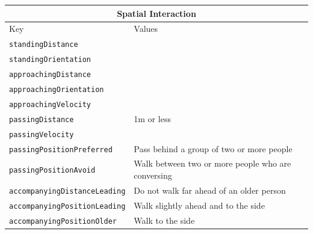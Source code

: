\documentclass{CSSRforAfrica}
\begin{document}
\begin{table}[H]
\begin{center}
\begin{tabular}{|l l|}
\hline \hline
\multicolumn{2}{|c|}{{\small \bf Spatial Interaction}} \\
\hline \hline
 {\small Key  }                                         &  {\small Values }      \\
\hline
{\footnotesize \verb+standingDistance+} 	           & {\footnotesize \verb++ } \vspace{-1mm}\\
{\footnotesize \verb+standingOrientation+} 	           & {\footnotesize \verb++} \vspace{-1mm}\\
{\footnotesize \verb+approachingDistance+} 	   & {\footnotesize \verb++} \vspace{-1mm}\\
{\footnotesize \verb+approachingOrientation+} 	   & {\footnotesize \verb++} \vspace{-1mm}\\
{\footnotesize \verb+approachingVelocity+} 	           & {\footnotesize \verb++} \vspace{-1mm}\\
{\footnotesize \verb+passingDistance+} 	           & {\footnotesize \verb++ 1m or less} \vspace{-1mm}\\
{\footnotesize \verb+passingVelocity+} 	                  & {\footnotesize \verb++  } \vspace{-1mm}\\
{\footnotesize \verb+passingPositionPreferred+} 	  & {\footnotesize \verb++ Pass behind a group of two or more people} \vspace{-1mm}\\
{\footnotesize \verb+passingPositionAvoid+}          & {\footnotesize \verb++ Walk between two or more people who are conversing} \vspace{-1mm}\\ 
{\footnotesize \verb+accompanyingDistanceLeading+}  & {\footnotesize \verb++ Do not walk far ahead of an older person} \vspace{-1mm}\\
{\footnotesize \verb+accompanyingPositionLeading+} 	   & {\footnotesize \verb++ Walk slightly ahead and to the side} \vspace{-1mm}\\
{\footnotesize \verb+accompanyingPositionOlder+} 	   & {\footnotesize \verb++ Walk to the side} \vspace{-1mm}\\

\end{tabular}
\end{center}
\end{table}
\end{document}
